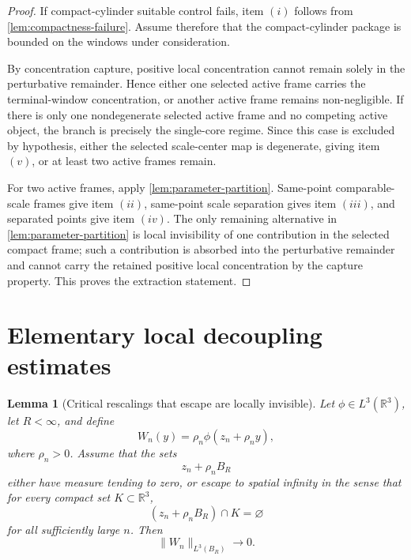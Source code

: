 \documentclass[11pt]{amsart}
\theoremstyle{plain}
\newtheorem{lemma}[theorem]{Lemma}
\theoremstyle{definition}
\theoremstyle{remark}
\begin{document}
\begin{proof}
If compact-cylinder suitable control fails, item \((i)\) follows from
\cref{lem:compactness-failure}.  Assume therefore that the compact-cylinder
package is bounded on the windows under consideration.
\par
By concentration capture, positive local concentration cannot remain solely in
the perturbative remainder.  Hence either one selected active frame carries the
terminal-window concentration, or another active frame remains non-negligible.
If there is only one nondegenerate selected active frame and no competing active
object, the branch is precisely the single-core regime.  Since this case is
excluded by hypothesis, either the selected scale-center map is degenerate,
giving item \((v)\), or at least two active frames remain.
\par
For two active frames, apply \cref{lem:parameter-partition}.  Same-point
comparable-scale frames give item \((ii)\), same-point scale separation gives
item \((iii)\), and separated points give item \((iv)\).  The only remaining
alternative in \cref{lem:parameter-partition} is local invisibility of one
contribution in the selected compact frame; such a contribution is absorbed
into the perturbative remainder and cannot carry the retained positive local
concentration by the capture property.  This proves the extraction statement.
\end{proof}

\section{Elementary local decoupling estimates}

\begin{lemma}[Critical rescalings that escape are locally invisible]\label{lem:escaping-l3}
Let \(\phi\in L^3(\mathbb R^3)\), let \(R<\infty\), and define
\[
  W_n(y)=\rho_n\phi(z_n+\rho_n y),
\]
where \(\rho_n>0\).  Assume that the sets
\[
  z_n+\rho_nB_R
\]
either have measure tending to zero, or escape to spatial infinity in the sense
that for every compact set \(K\subset\mathbb R^3\),
\[
  (z_n+\rho_nB_R)\cap K=\varnothing
\]
for all sufficiently large \(n\).  Then
\[
  \|W_n\|_{L^3(B_R)}\to0.
\]
\end{lemma}
\end{document}
